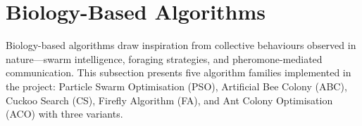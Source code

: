 \section{Biology-Based Algorithms}

Biology-based algorithms draw inspiration from collective behaviours observed in nature—swarm intelligence, foraging strategies, and pheromone-mediated communication. This subsection presents five algorithm families implemented in the project: Particle Swarm Optimisation (PSO), Artificial Bee Colony (ABC), Cuckoo Search (CS), Firefly Algorithm (FA), and Ant Colony Optimisation (ACO) with three variants.





